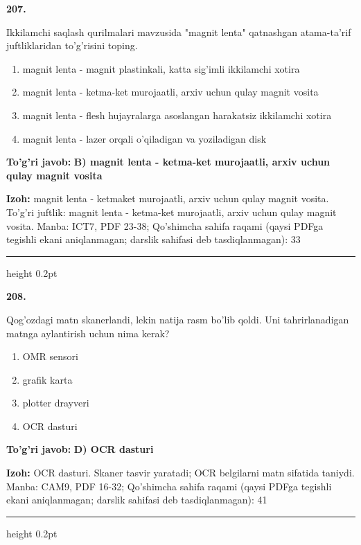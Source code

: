 \documentclass[10pt,a4paper]{article}
\begin{document}
{\bfseries\sffamily\color{ink} 207.}
\par
Ikkilamchi saqlash qurilmalari mavzusida "magnit lenta" qatnashgan atama-ta'rif juftliklaridan to'g'risini toping.
\begin{enumerate}[label=\Alph*),leftmargin=9mm]
\item magnit lenta - magnit plastinkali, katta sig'imli ikkilamchi xotira
\item magnit lenta - ketma-ket murojaatli, arxiv uchun qulay magnit vosita
\item magnit lenta - flesh hujayralarga asoslangan harakatsiz ikkilamchi xotira
\item magnit lenta - lazer orqali o'qiladigan va yoziladigan disk
\end{enumerate}
\begin{tcolorbox}[enhanced,breakable,colback=teal!4,colframe=teal!60!black,boxrule=0.45pt,arc=1.2mm,left=2.7mm,right=2.7mm,top=1.8mm,bottom=1.8mm,before skip=2mm,after skip=2mm]
{\bfseries\sffamily\color{teal}To'g'ri javob:} \textbf{B) magnit lenta - ketma-ket murojaatli, arxiv uchun qulay magnit vosita}
\par\smallskip
{\bfseries Izoh:} magnit lenta - ketmaket murojaatli, arxiv uchun qulay magnit vosita. To'g'ri juftlik: magnit lenta - ketma-ket murojaatli, arxiv uchun qulay magnit vosita. Manba: ICT7, PDF 23-38; Qo'shimcha sahifa raqami (qaysi PDFga tegishli ekani aniqlanmagan; darslik sahifasi deb tasdiqlanmagan): 33
\end{tcolorbox}
\vspace{2mm}\hrule height 0.2pt\vspace{3mm}

{\bfseries\sffamily\color{ink} 208.}
\par
Qog'ozdagi matn skanerlandi, lekin natija rasm bo'lib qoldi. Uni tahrirlanadigan matnga aylantirish uchun nima kerak?
\begin{enumerate}[label=\Alph*),leftmargin=9mm]
\item OMR sensori
\item grafik karta
\item plotter drayveri
\item OCR dasturi
\end{enumerate}
\begin{tcolorbox}[enhanced,breakable,colback=teal!4,colframe=teal!60!black,boxrule=0.45pt,arc=1.2mm,left=2.7mm,right=2.7mm,top=1.8mm,bottom=1.8mm,before skip=2mm,after skip=2mm]
{\bfseries\sffamily\color{teal}To'g'ri javob:} \textbf{D) OCR dasturi}
\par\smallskip
{\bfseries Izoh:} OCR dasturi. Skaner tasvir yaratadi; OCR belgilarni matn sifatida taniydi. Manba: CAM9, PDF 16-32; Qo'shimcha sahifa raqami (qaysi PDFga tegishli ekani aniqlanmagan; darslik sahifasi deb tasdiqlanmagan): 41
\end{tcolorbox}
\vspace{2mm}\hrule height 0.2pt\vspace{3mm}
\end{document}
